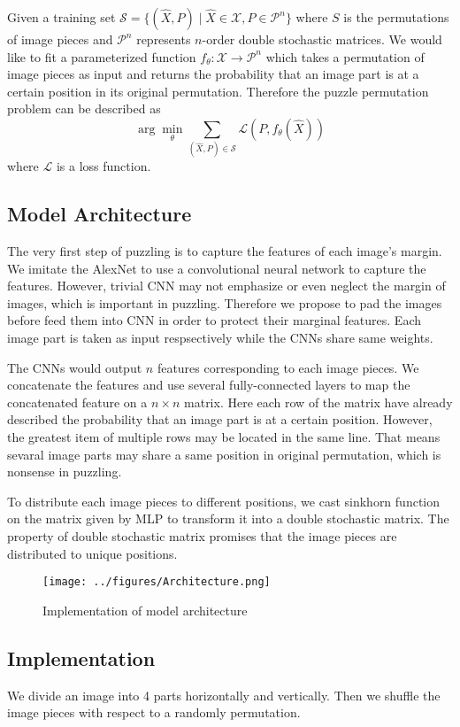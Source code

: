 \documentclass[twocolumn]{article}
\begin{document}
Given a training set $\mathcal{S}=\{(\hat{X},P)\mid\hat{X}\in\mathcal{X},P\in\mathcal{P}^{n}\}$ where $S$ 
is the permutations of image pieces and $\mathcal{P}^{n}$ represents $n$-order double stochastic matrices. 
We would like to fit a parameterized function $f_{\theta}:\mathcal{X}\rightarrow\mathcal{P}^{n}$ which 
takes a permutation of image pieces as input and returns the probability that an image part is at a certain 
position in its original permutation. Therefore the puzzle permutation problem can be described as 
$$\arg\min_{\theta}\sum_{(\hat{X},P)\in\mathcal{S}}\mathcal{L}(P,f_{\theta}(\hat{X}))$$
where $\mathcal{L}$ is a loss function. 
\subsection{Model Architecture}
The very first step of puzzling is to capture the features of each image's margin. We imitate the AlexNet 
to use a convolutional neural network to capture the features. However, trivial CNN may not emphasize or even 
neglect the margin of images, which is important in puzzling. Therefore we propose to pad the images 
before feed them into CNN in order to protect their marginal features. Each image part is taken as input 
respsectively while the CNNs share same weights. 

The CNNs would output $n$ features corresponding to each image pieces. We concatenate the features and 
use several fully-connected layers to map the concatenated feature on a $n\times n$ matrix. Here each 
row of the matrix have already described the probability that an image part is at a certain position. 
However, the greatest item of multiple rows may be located in the same line. That means sevaral image 
parts may share a same position in original permutation, which is nonsense in puzzling. 

To distribute each image pieces to different positions, we cast sinkhorn function on the matrix given by 
MLP to transform it into a double stochastic matrix. The property of double stochastic matrix promises 
that the image pieces are distributed to unique positions. 
\begin{figure*}[t]
    \centering
    \texttt{[image: ../figures/Architecture.png]}
    \caption{Implementation of model architecture}
\end{figure*}
\subsection{Implementation}
We divide an image into 4 parts horizontally and vertically. Then we shuffle the image pieces with 
respect to a randomly permutation. 
\end{document}
